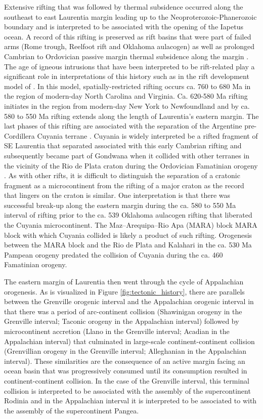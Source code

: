 \documentclass[11pt,letterpaper]{article}
\begin{document}
Extensive rifting that was followed by thermal subsidence occurred along the southeast to east Laurentia margin leading up to the Neoproterozoic-Phanerozoic boundary and is interpreted to be associated with the opening of the Iapetus ocean. A record of this rifting is preserved as rift basins that were part of failed arms (Rome trough, Reelfoot rift and Oklahoma aulacogen) as well as prolonged Cambrian to Ordovician passive margin thermal subsidence along the margin \citep{Bond1984a,Whitmeyer2007a}. The age of igneous intrusions that have been interpreted to be rift-related play a significant role in interpretations of this history such as in the rift development model of \citet{Burton2010a}. In this model, spatially-restricted rifting occurs ca. 760 to 680 Ma in the region of modern-day North Carolina and Virginia. Ca. 620-580 Ma rifting initiates in the region from modern-day New York to Newfoundland and by ca. 580 to 550 Ma rifting extends along the length of Laurentia's eastern margin. The last phases of this rifting are associated with the separation of the Argentine pre-Cordillera Cuyania terrane \citep{Dickerson1998a}. Cuyania is widely interpreted be a rifted fragment of SE Laurentia that separated associated with this early Cambrian rifting and subsequently became part of Gondwana when it collided with other terranes in the vicinity of the Rio de Plata craton during the Ordovician Famatinian orogeny \citep{Martin2019a}. As with other rifts, it is difficult to distinguish the separation of a cratonic fragment as a microcontinent from the rifting of a major craton as the record that lingers on the craton is similar. One interpretation is that there was successful break-up along the eastern margin during the ca. 580 to 550 Ma interval of rifting prior to the ca. 539 Oklahoma aulacogen rifting that liberated the Cuyania microcontinent. The Maz–Arequipa–Rio Apa (MARA) block MARA block with which Cuyania collided \citep{Martin2019a} is likely a product of such rifting. Orogenesis between the MARA block and the Rio de Plata and Kalahari in the ca. 530 Ma Pampean orogeny \citep{Casquet2018a} predated the collision of Cuyania during the ca. 460 Famatinian orogeny. 

The eastern margin of Laurentia then went through the cycle of Appalachian orogenesis. As is visualized in Figure \ref{fig:tectonic_history}, there are parallels between the Grenville orogenic interval and the Appalachian orogenic interval in that there was a period of arc-continent collision (Shawinigan orogeny in the Grenville interval; Taconic orogeny in the Appalachian interval) followed by microcontinent accretion (Llano in the Grenville interval; Acadian in the Appalachian interval) that culminated in large-scale continent-continent collision (Grenvillian orogeny in the Grenville interval; Alleghanian in the Appalachian interval). These similarities are the consequence of an active margin facing an ocean basin that was progressively consumed until its consumption resulted in continent-continent collision. In the case of the Grenville interval, this terminal collision is interpreted to be associated with the assembly of the supercontinent Rodinia and in the Appalachian interval it is interpreted to be associated to with the assembly of the supercontinent Pangea.
\end{document}
